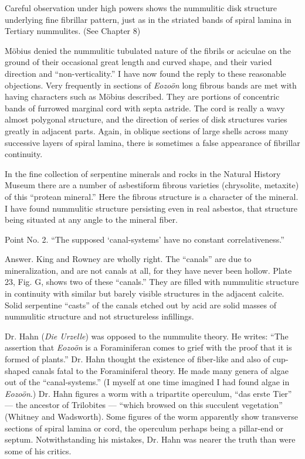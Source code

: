 \documentclass[a4paper, 12pt, oneside, landscape]{article}
\begin{document}
Careful observation under high powers shows the nummulitic disk structure underlying fine fibrillar pattern, just as in the striated bands of spiral lamina in Tertiary nummulites. (See Chapter 8)

Möbius denied the nummulitic tubulated nature of the fibrils or aciculae on the ground of their occasional great length and curved shape, and their varied direction and ``non-verticality.'' I have now found the reply to these reasonable objections. Very frequently in sections of \emph{Eozoön} long fibrous bands are met with having characters such as Möbius described. They are portions of concentric bands of furrowed marginal cord with septa astride. The cord is really a wavy almost polygonal structure, and the direction of series of disk structures varies greatly in adjacent parts. Again, in oblique sections of large shells across many successive layers of spiral lamina, there is sometimes a false appearance of fibrillar continuity.

In the fine collection of serpentine minerals and rocks in the Natural History Museum there are a number of asbestiform fibrous varieties (chrysolite, metaxite) of this ``protean mineral.'' Here the fibrous structure is a character of the mineral. I have found nummulitic structure persisting even in real asbestos, that structure being situated at any angle to the mineral fiber.

Point No. 2. ``The supposed `canal-systems' have no constant correlativeness.''

Answer. King and Rowney are wholly right. The ``canals'' are due to mineralization, and are not canals at all, for they have never been hollow. Plate 23, Fig. G, shows two of these ``canals.'' They are filled with nummulitic structure in continuity with similar but barely visible structures in the adjacent calcite. Solid serpentine ``casts'' of the canals etched out by acid are solid masses of nummulitic structure and not structureless infillings.

Dr. Hahn (\emph{Die Urzelle}) was opposed to the nummulite theory. He writes: ``The assertion that \emph{Eozoön} is a Foraminiferan comes to grief with the proof that it is formed of plants.'' Dr. Hahn thought the existence of fiber-like and also of cup-shaped canals fatal to the Foraminiferal theory. He made many genera of algae out of the ``canal-systems.'' (I myself at one time imagined I had found algae in \emph{Eozoön}.) Dr. Hahn figures a worm with a tripartite operculum, ``das erste Tier'' --- the ancestor of Trilobites --- ``which browsed on this succulent vegetation'' (Whitney and Wadsworth). Some figures of the worm apparently show transverse sections of spiral lamina or cord, the operculum perhaps being a pillar-end or septum. Notwithstanding his mistakes, Dr. Hahn was nearer the truth than were some of his critics.
\end{document}
